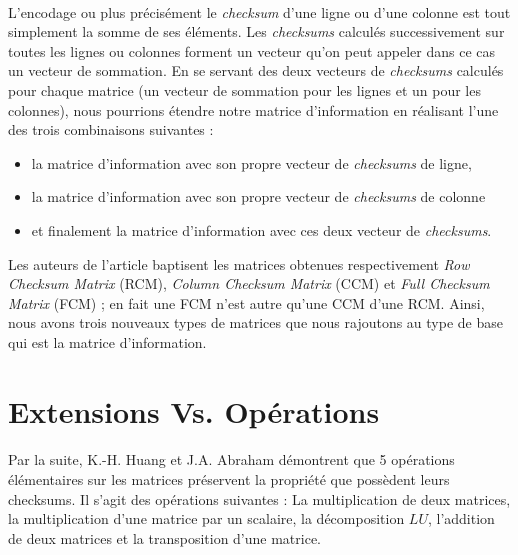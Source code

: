 \documentclass[a4paper, 10pt]{report}
\begin{document}
\paragraph*{}
L’encodage ou plus précisément le \textit{checksum} d’une ligne ou d’une colonne est tout simplement la somme de ses 
éléments. 
Les \textit{checksums} calculés successivement sur toutes les lignes ou colonnes forment un vecteur qu’on peut appeler 
dans ce cas un vecteur de sommation.\newline
En se servant des deux vecteurs de \textit{checksums} calculés pour chaque matrice (un vecteur de sommation pour les 
lignes 
et un pour les colonnes), nous pourrions étendre notre matrice d’information en réalisant l’une des trois combinaisons 
suivantes : 
\begin{itemize}
 \item la matrice d’information avec son propre vecteur de \textit{checksums} de ligne,
 \item la matrice d’information avec son propre vecteur de \textit{checksums} de colonne
 \item et finalement la matrice d’information avec ces deux vecteur de \textit{checksums}.
\end{itemize}
Les auteurs de l'article baptisent les matrices obtenues respectivement \textit{Row Checksum Matrix} (RCM), 
\textit{Column Checksum Matrix} (CCM) et \textit{Full Checksum Matrix} (FCM) ; en fait une FCM n’est autre 
qu’une CCM d’une RCM.
\newline
\label{sec:Matrices}
Ainsi, nous avons trois nouveaux types de matrices que nous rajoutons au type de base qui est la matrice d’information.

\section{Extensions Vs. Opérations}
\label{sec:Operations}
\paragraph*{}
Par la suite, K.-H. Huang et J.A. Abraham démontrent que 5 opérations élémentaires sur les matrices préservent 
la propriété que possèdent leurs checksums. Il s’agit des opérations suivantes : \newline
La multiplication de deux matrices, la multiplication d’une matrice par un scalaire, la décomposition $LU$, 
l’addition de deux matrices et la transposition d’une matrice.
\end{document}
